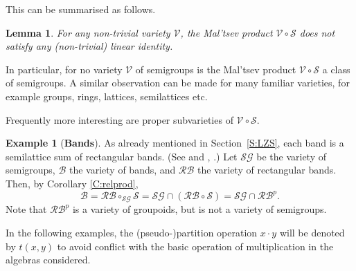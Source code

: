 \documentclass{birkau}
\newcommand{\mc}{\mathcal}
\newcommand{\mcV}{\mathcal{V}}
\newcommand{\mcS}{\mathcal{S}}
\newcommand{\pro}[1]{{#1}^p}
\theoremstyle{plain}
\newtheorem{lemma}[theorem]{Lemma}
\theoremstyle{definition}
\newtheorem{example}[theorem]{Example}
\numberwithin{equation}{section}
\begin{document}
This can be summarised as follows.

\begin{lemma}\label{L:linid}
For any non-trivial variety $\mcV$, the Mal'tsev product $\mcV \circ \mcS$ does not
satisfy any (non-trivial) linear identity.
\end{lemma}

In particular, for no variety $\mcV$ of semigroups is the Mal'tsev product
$\mcV \circ \mcS$ a class of semigroups.  A similar observation can be made for many
familiar varieties, for example groups, rings, lattices, semilattices etc.

Frequently more interesting are proper subvarieties of $\mcV \circ \mcS$.

\begin{example} [\textbf{Bands}] As already mentioned in Section~\ref{S:LZS}, each band is
  a semilattice sum of rectangular bands. (See \cite{Mc54} and \cite{H76}, \cite{H95}.)
  Let $\mc{SG}$ be the variety of semigroups, $\mc{B}$ the variety of bands, and
  $\mc{RB}$ the variety of rectangular bands. Then, by Corollary \ref{C:relprod},
  \begin{equation*}
\mc{B} = \mc{RB} \circ_{\mc{SG}} \mcS = \mc{SG} \cap (\mc{RB} \circ \mcS) = \mc{SG} \cap
\pro{\mc{RB}}. 
\end{equation*}
Note that $\pro{\mc{RB}}$ is a variety of groupoids, but is not a variety of semigroups.
\end{example}

In the following examples, the (pseudo-)partition operation $x \cdot y$ will be denoted by
$t(x,y)$ to avoid conflict with the basic operation of multiplication in the algebras
considered.
\end{document}
